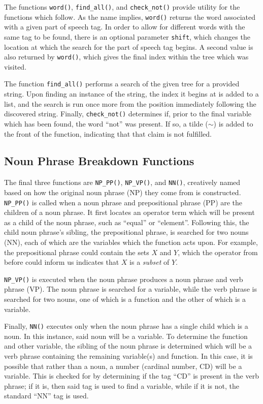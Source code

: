 The functions \texttt{word()}, \texttt{find\_all()}, and \texttt{check\_not()} provide utility for the functions which follow. As the name implies, \texttt{word()} returns the word associated with a given part of speech tag. In order to allow for different words with the same tag to be found, there is an optional parameter \texttt{shift}, which changes the location at which the search for the part of speech tag begins. A second value is also returned by \texttt{word()}, which gives the final index within the tree which was visited.

The function \texttt{find\_all()} performs a search of the given tree for a provided string. Upon finding an instance of the string, the index it begins at is added to a list, and the search is run once more from the position immediately following the discovered string. Finally, \texttt{check\_not()} determines if, prior to the final variable which has been found, the word ``not'' was present. If so, a tilde ($\sim$) is added to the front of the function, indicating that that claim is not fulfilled.

\subsection{Noun Phrase Breakdown Functions}

The final three functions are \texttt{NP\_PP()}, \texttt{NP\_VP()}, and \texttt{NN()}, creatively named based on how the original noun phrase (NP) they come from is constructed. \texttt{NP\_PP()} is called when a noun phrase and prepositional phrase (PP) are the children of a noun phrase. It first locates an operator term which will be present as a child of the noun phrase, such as ``equal'' or ``element''. Following this, the child noun phrase's sibling, the prepositional phrase, is searched for two nouns (NN), each of which are the variables which the function acts upon. For example, the prepositional phrase could contain the sets $X$ and $Y$, which the operator from before could inform us indicates that $X$ is a \textit{subset} of $Y$.

\label{npvp}
\texttt{NP\_VP()} is executed when the noun phrase produces a noun phrase and verb phrase (VP). The noun phrase is searched for a variable, while the verb phrase is searched for two nouns, one of which is a function and the other of which is a variable.

Finally, \texttt{NN()} executes only when the noun phrase has a single child which is a noun. In this instance, said noun will be a variable. To determine the function and other variable, the sibling of the noun phrase is determined which will be a verb phrase containing the remaining variable(s) and function. In this case, it is possible that rather than a noun, a number (cardinal number, CD) will be a variable. This is checked for by determining if the tag ``CD'' is present in the verb phrase; if it is, then said tag is used to find a variable, while if it is not, the standard ``NN'' tag is used.

